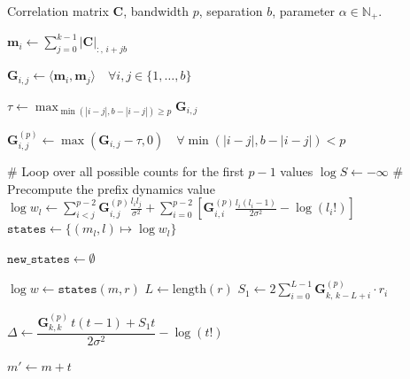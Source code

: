 \documentclass{article}
\theoremstyle{plain}
\theoremstyle{definition}
\theoremstyle{remark}
\begin{document}
\begin{algorithm}[t!]
\caption{Rényi Accountant ``remove'' direction}
\label{alg:renyi_dynamic_program}
\begin{algorithmic}[1]

\REQUIRE Correlation matrix $\mathbf{C}$, bandwidth $p$, separation $b$, parameter $\alpha \in \mathbb{N}_{+}$.

\STATE $\mathbf{m}_i \leftarrow \sum_{j=0}^{k-1} |\mathbf{C}|_{:,\, i + jb}$

\STATE $\mathbf{G}_{i,j} \leftarrow \langle \mathbf{m}_i, \mathbf{m}_j \rangle \quad \forall i,j \in \{1,\dots,b\}$

\STATE $\tau \leftarrow \max_{\min(|i-j|, b- |i - j|) \ge p} \mathbf{G}_{i,j}$

\STATE $\mathbf{G}^{(p)}_{i,j} \leftarrow \max(\mathbf{G}_{i,j} - \tau, 0) \quad \forall \min(|i-j|, b- |i - j|) < p$

\STATE \# Loop over all possible counts for the first $p-1$ values
\STATE $\log S \leftarrow -\infty$
\STATE \# Precompute the prefix dynamics value
\STATE $\log w_l \leftarrow \sum\limits_{i < j}^{p - 2} \mathbf{G}^{(p)}_{i,j}\frac{l_i l_j}{\sigma^2} +\sum\limits_{i = 0}^{p - 2}[ \mathbf{G}^{(p)}_{i,i}\frac{l_i(l_i - 1)}{2\sigma^2}-\log (l_i!)]$
\STATE $\texttt{states} \leftarrow \{(m_l, l) \mapsto \log w_l\}$
    
    \STATE $\texttt{new\_states} \leftarrow \emptyset$
    
        \STATE $\log w \leftarrow \texttt{states}(m,r)$
        \STATE $L \leftarrow \text{length}(r)$
        \STATE $S_1 \leftarrow 2 \sum_{i=0}^{L-1} \mathbf{G}^{(p)}_{k,\,k-L+i } \cdot r_i$
        
            \STATE
            $\Delta \leftarrow
            \dfrac{\mathbf{G}^{(p)}_{k,k} \, t(t-1) + S_1 t}{2\sigma^2}
            - \log(t!)$
            
            \STATE $m' \leftarrow m + t$


\end{algorithmic}
\end{algorithm}
\end{document}
